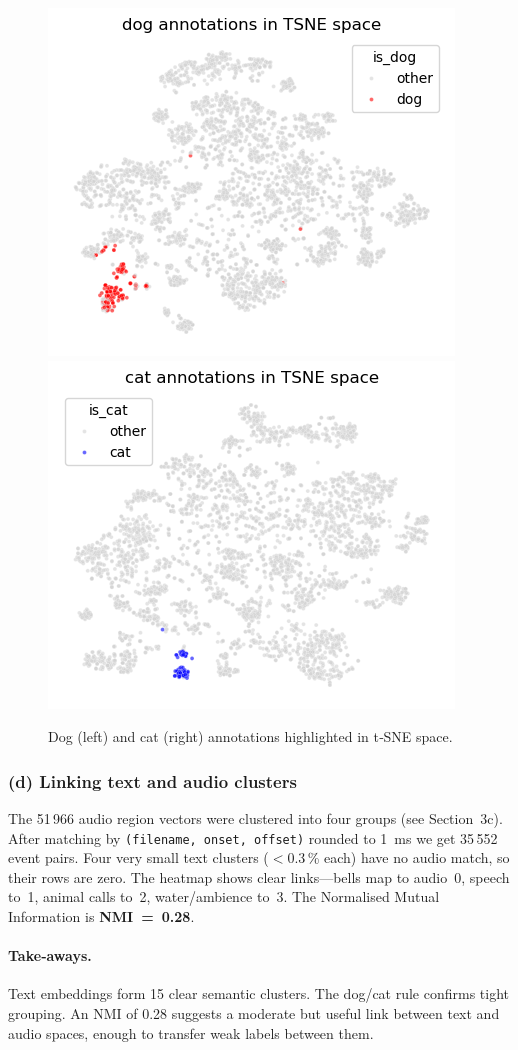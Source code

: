\documentclass{article}
\begin{document}
\begin{figure}[h]
  \centering
  \includegraphics[width=.42\linewidth]{figs_tang/04_dog_annotations_in_tsne_space.png}\hfill
  \includegraphics[width=.42\linewidth]{figs_tang/04_cat_annotations_in_tsne_space.png}
  \caption{Dog (left) and cat (right) annotations highlighted in t‑SNE space.}
  \label{fig:dogcat_tsne}
\end{figure}

\subsubsection{(d) Linking text and audio clusters}
The 51\,966 audio region vectors were clustered into four groups (see Section~3c). After matching by \texttt{(filename, onset, offset)} rounded to 1 ms we get 35\,552 event pairs. Four very small text clusters ($<0.3$\,\% each) have no audio match, so their rows are zero. The heatmap shows clear links—bells map to audio 0, speech to 1, animal calls to 2, water/ambience to 3. The Normalised Mutual Information is \textbf{NMI = 0.28}.

\paragraph{Take‑aways.} Text embeddings form 15 clear semantic clusters. The dog/cat rule confirms tight grouping. An NMI of 0.28 suggests a moderate but useful link between text and audio spaces, enough to transfer weak labels between them.

\end{document}
